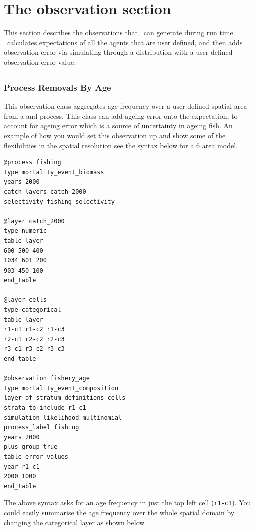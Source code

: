 \section{The observation section\label{sec:observation-section}}
This section describes the observations that \IBM\ can generate during run time. \IBM\ calculates expectations of all the agents that are user defined, and then adds observation error via simulating through a distribution with a user defined observation error value.
\subsection{\label{sec:Observations}}

\subsubsection{Process Removals By Age}\label{subsubsec:catch_at_age}
This observation class aggregates age frequency over a user defined spatial area from a  and  process. This class can add ageing error onto the expectation, to account for ageing error which is a source of uncertainty in ageing fish. An example of how you would set this observation up and show some of the flexibilities in the spatial resolution see the syntax below for a 6 area model.

{\small{\begin{verbatim}
@process fishing
type mortality_event_biomass
years 2000
catch_layers catch_2000
selectivity fishing_selectivity

@layer catch_2000
type numeric
table_layer
600 500 400
1034 601 200
903 450 100
end_table

@layer cells
type categorical
table_layer
r1-c1 r1-c2 r1-c3
r2-c1 r2-c2 r2-c3
r3-c1 r3-c2 r3-c3
end_table

@observation fishery_age
type mortality_event_composition
layer_of_stratum_definitions cells
strata_to_include r1-c1
simulation_likelihood multinomial
process_label fishing
years 2000
plus_group true
table error_values
year r1-c1
2000 1000
end_table
\end{verbatim}}}

The above syntax asks for an age frequency in just the top left cell (\texttt{r1-c1}). You could easily summarise the age frequency over the whole spatial domain by changing the categorical layer as shown below

